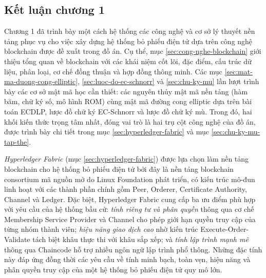 \subsection{Kết luận chương 1}

Chương 1 đã trình bày một cách hệ thống các công nghệ và cơ sở lý thuyết nền tảng phục vụ cho việc xây dựng hệ thống bỏ phiếu điện tử dựa trên công nghệ blockchain được đề xuất trong đồ án. Cụ thể, mục \ref{sec:cong-nghe-blockchain} giới thiệu tổng quan về blockchain với các khái niệm cốt lõi, đặc điểm, cấu trúc dữ liệu, phân loại, cơ chế đồng thuận và hợp đồng thông minh. Các mục \ref{sec:mat-ma-duong-cong-elliptic}, \ref{sec:luoc-do-ec-schnorr} và \ref{sec:chu-ky-mu} lần lượt trình bày các cơ sở mật mã học cần thiết: các nguyên thủy mật mã nền tảng (hàm băm, chữ ký số, mô hình ROM) cùng mật mã đường cong elliptic dựa trên bài toán ECDLP, lược đồ chữ ký EC-Schnorr và lược đồ chữ ký mù. Trong đó, hai khối kiến thức trọng tâm nhất, đóng vai trò là hai trụ cột công nghệ của đồ án, được trình bày chi tiết trong mục \ref{sec:hyperledger-fabric} và mục \ref{sec:chu-ky-mu-tap-the}.

\textit{Hyperledger Fabric} (mục \ref{sec:hyperledger-fabric}) được lựa chọn làm nền tảng blockchain cho hệ thống bỏ phiếu điện tử bởi đây là nền tảng blockchain consortium mã nguồn mở do Linux Foundation phát triển, có kiến trúc mô-đun linh hoạt với các thành phần chính gồm Peer, Orderer, Certificate Authority, Channel và Ledger. Đặc biệt, Hyperledger Fabric cung cấp ba ưu điểm phù hợp với yêu cầu của hệ thống bầu cử: \textit{tính riêng tư và phân quyền} thông qua cơ chế Membership Service Provider và Channel cho phép giới hạn quyền truy cập của từng nhóm thành viên; \textit{hiệu năng giao dịch cao} nhờ kiến trúc Execute-Order-Validate tách biệt khâu thực thi với khâu sắp xếp; và \textit{tính lập trình mạnh mẽ} thông qua Chaincode hỗ trợ nhiều ngôn ngữ lập trình phổ thông. Những đặc tính này đáp ứng đồng thời các yêu cầu về tính minh bạch, toàn vẹn, hiệu năng và phân quyền truy cập của một hệ thống bỏ phiếu điện tử quy mô lớn.

